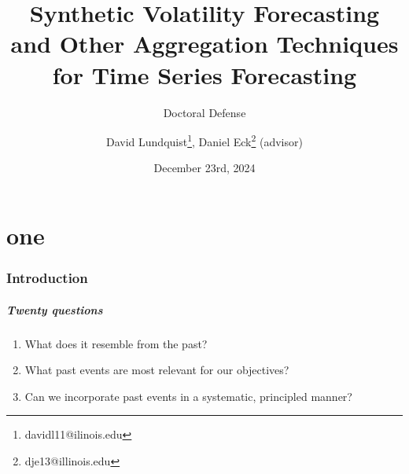 \documentclass[9pt]{beamer}
\title{Synthetic Volatility Forecasting and Other Aggregation Techniques for Time Series Forecasting}
\subtitle{Doctoral Defense}
\author{David Lundquist\thanks{davidl11@ilinois.edu}, Daniel Eck\thanks{dje13@illinois.edu} (advisor)}
\date{December 23rd, 2024}
\theoremstyle{definition}
\begin{document}
\part{one}
\begin{frame}
\titlepage
\end{frame}

\section{Introduction}

\begin{frame}
    \frametitle{Twenty questions}
    \begin{enumerate}
        \item  What does it resemble from the past?
        \item  What past events are most relevant for our objectives?
        \item Can we incorporate past events in a systematic, principled manner?
        

\end{enumerate}
\end{frame}
\end{document}
